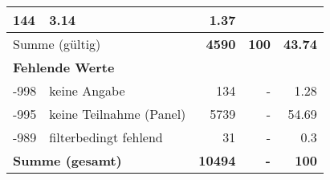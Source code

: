 \begin{longtable}{lXrrr}
       \num{144} &
       \num[round-mode=places,round-precision=2]{3.14} &
         \num[round-mode=places,round-precision=2]{1.37} \\
     \midrule
     \multicolumn{2}{l}{Summe (gültig)} &
       \textbf{\num{4590}} &
     \textbf{\num{100}} &
       \textbf{\num[round-mode=places,round-precision=2]{43.74}} \\
     \multicolumn{5}{l}{\textbf{Fehlende Werte}}\\
       -998 &
       keine Angabe &
         \num{134} &
        - &
         \num[round-mode=places,round-precision=2]{1.28} \\
       -995 &
       keine Teilnahme (Panel) &
         \num{5739} &
        - &
         \num[round-mode=places,round-precision=2]{54.69} \\
       -989 &
       filterbedingt fehlend &
         \num{31} &
        - &
         \num[round-mode=places,round-precision=2]{0.3} \\
     \midrule
     \multicolumn{2}{l}{\textbf{Summe (gesamt)}} &
          \textbf{\num{10494}} &
        \textbf{-} &
        \textbf{\num{100}} \\
     \bottomrule
     \end{longtable}
     
